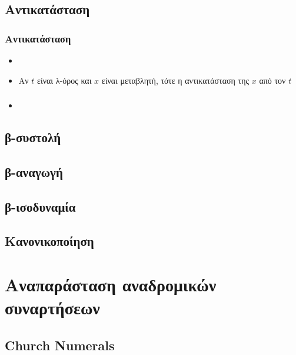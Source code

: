 \documentclass{beamer}
\begin{document}
\subsection{Αντικατάσταση}

\begin{frame}
        \frametitle{Αντικατάσταση}
        \begin{itemize}
        	\item 
        	\item Αν \(t\) είναι λ-όρος και \(x\) είναι μεταβλητή, τότε η αντικατάσταση της \(x\)
            από τον \(t\)
        \end{itemize}
\end{frame}

\begin{frame}
        \frametitle{}
        \begin{itemize}
                \item
        \end{itemize}
\end{frame}

\subsection{β-συστολή}
\subsection{β-αναγωγή}
\subsection{β-ισοδυναμία}
\subsection{Κανονικοποίηση}

\section{Αναπαράσταση αναδρομικών συναρτήσεων}

\subsection{Church Numerals}
\end{document}
